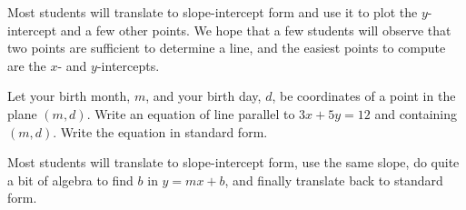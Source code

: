 \documentclass[nooutcomes,instructornotes]{ximera}
\begin{document}
\begin{teachingnote}
Most students will translate to slope-intercept form and use it to plot the $y$-intercept and a few other points.  We hope that a few students will observe that two points are sufficient to determine a line, and the easiest points to compute are the $x$- and $y$-intercepts.  
\end{teachingnote}


\begin{problem}
Let your birth month, $m$,  and your birth day, $d$, be coordinates of a point in the plane $(m,d)$.  Write an equation of line parallel to $3x+5y=12$ and containing $(m,d)$.  Write the equation in standard form. 

\begin{teachingnote}
Most students will translate to slope-intercept form, use the same slope, do quite a bit of 
algebra to find $b$ in $y=mx+b$, and finally translate back to standard form.  
\end{teachingnote}

\end{problem}
\end{document}
